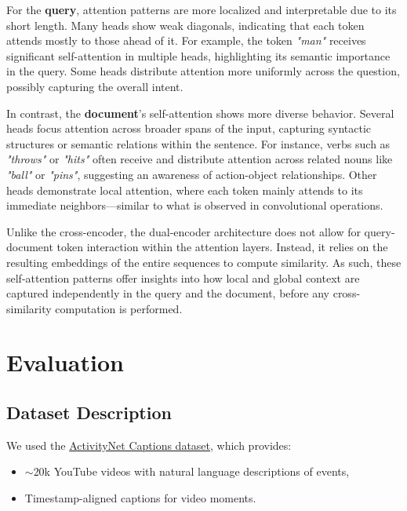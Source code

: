 \documentclass[runningheads]{llncs}
\begin{document}
For the \textbf{query}, attention patterns are more localized and interpretable due to its short length. Many heads show weak diagonals, indicating that each token attends mostly to those ahead of it. For example, the token \textit{"man"} receives significant self-attention in multiple heads, highlighting its semantic importance in the query. Some heads distribute attention more uniformly across the question, possibly capturing the overall intent.

In contrast, the \textbf{document}'s self-attention shows more diverse behavior. Several heads focus attention across broader spans of the input, capturing syntactic structures or semantic relations within the sentence. For instance, verbs such as \textit{"throws"} or \textit{"hits"} often receive and distribute attention across related nouns like \textit{"ball"} or \textit{"pins"}, suggesting an awareness of action-object relationships. Other heads demonstrate local attention, where each token mainly attends to its immediate neighbors—similar to what is observed in convolutional operations.

Unlike the cross-encoder, the dual-encoder architecture does not allow for query-document token interaction within the attention layers. Instead, it relies on the resulting embeddings of the entire sequences to compute similarity. As such, these self-attention patterns offer insights into how local and global context are captured independently in the query and the document, before any cross-similarity computation is performed.


\vspace{2\baselineskip} %

\section{Evaluation}

\subsection{Dataset Description}
We used the \href{https://huggingface.co/datasets/HuggingFaceM4/ActivitiyNet_Captions}{ActivityNet Captions dataset}, which provides:

\begin{itemize}
    \item \ensuremath{\sim}20k YouTube videos with natural language descriptions of events,
    \item Timestamp-aligned captions for video moments.
\end{itemize}
\end{document}
